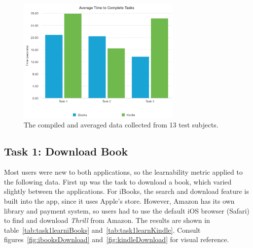 \documentclass[journal, a4paper]{IEEEtran}
\begin{document}
    \begin{figure}[!hbt]
		\begin{center}
		\includegraphics[width=8cm]{averagesGraph}
		\caption{The compiled and averaged data collected from 13 test subjects.}
		\label{fig:averagesGraph}
		\end{center}
	\end{figure}
	
\subsection{Task 1: Download Book}
	Most users were new to both applications, so the learnability metric applied to the following data. First up was the task to download a book, which varied slightly between the applications. For iBooks, the search and download feature is built into the app, since it uses Apple's store. However, Amazon has its own library and payment system, so users had to use the default iOS browser (Safari) to find and download \emph{Thrill} from Amazon. The results are shown in table~\ref{tab:task1learniBooks} and~\ref{tab:task1learnKindle}. Consult figures~\ref{fig:ibooksDownload} and~\ref{fig:kindleDownload} for visual reference.


    
\end{document}
